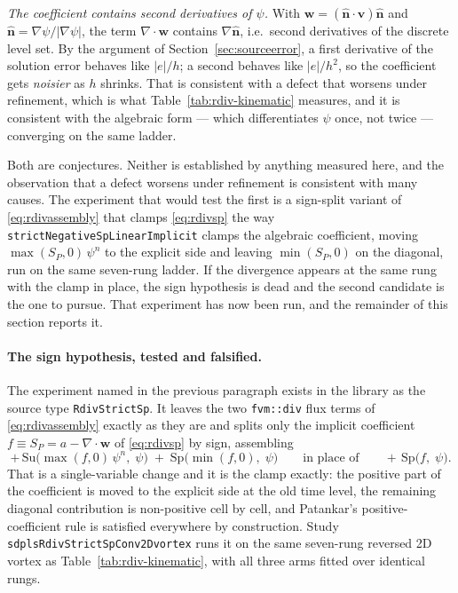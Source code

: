 \documentclass[preprint,3p,11pt]{elsarticle}
\newcommand{\psilev}{\psi}
\newcommand{\nhat}{\hat{\mathbf{n}}}
\newcommand{\gradpsi}{\lvert\nabla\psilev\rvert}
\begin{document}
\emph{The coefficient contains second derivatives of $\psilev$.} With
$\mathbf{w} = (\nhat\cdot\mathbf{v})\nhat$ and $\nhat =
\nabla\psilev/\gradpsi$, the term $\nabla\cdot\mathbf{w}$ contains
$\nabla\nhat$, i.e.\ second derivatives of the discrete level set. By the
argument of Section~\ref{sec:sourceerror}, a first derivative of the solution
error behaves like $|e|/h$; a second behaves like $|e|/h^2$, so the coefficient
gets \emph{noisier} as $h$ shrinks. That is consistent with a defect that worsens
under refinement, which is what Table~\ref{tab:rdiv-kinematic} measures, and it
is consistent with the algebraic form --- which differentiates $\psilev$ once,
not twice --- converging on the same ladder.

Both are conjectures. Neither is established by anything measured here, and the
observation that a defect worsens under refinement is consistent with many
causes. The experiment that would test the first is a sign-split variant of
\eqref{eq:rdivassembly} that clamps \eqref{eq:rdivsp} the way
\texttt{strictNegativeSpLinearImplicit} clamps the algebraic coefficient, moving
$\max(S_P,0)\,\psilev^n$ to the explicit side and leaving $\min(S_P,0)$ on the
diagonal, run on the same seven-rung ladder. If the divergence appears at the
same rung with the clamp in place, the sign hypothesis is dead and the second
candidate is the one to pursue. That experiment has now been run, and the
remainder of this section reports it.

\paragraph{The sign hypothesis, tested and falsified.} The experiment named in the
previous paragraph exists in the library as the source type
\texttt{RdivStrictSp}. It leaves the two \texttt{fvm::div} flux terms of
\eqref{eq:rdivassembly} exactly as they are and splits only the implicit
coefficient $f \equiv S_P = a - \nabla\cdot\mathbf{w}$ of \eqref{eq:rdivsp} by
sign, assembling
\begin{equation}
  +\,\mathrm{Su}\bigl(\max(f,0)\,\psilev^{n},\;\psilev\bigr)
  \;+\;\mathrm{Sp}\bigl(\min(f,0),\;\psilev\bigr)
  \qquad\text{in place of}\qquad
  +\,\mathrm{Sp}\bigl(f,\;\psilev\bigr).
  \label{eq:rdivstrictsp}
\end{equation}
That is a single-variable change and it is the clamp exactly: the positive part of
the coefficient is moved to the explicit side at the old time level, the remaining
diagonal contribution is non-positive cell by cell, and Patankar's
positive-coefficient rule \cite{patankar1980} is satisfied everywhere by
construction. Study \texttt{sdplsRdivStrictSpConv2Dvortex} runs it on the same
seven-rung reversed 2D vortex as Table~\ref{tab:rdiv-kinematic}, with all three
arms fitted over identical rungs.
\end{document}
